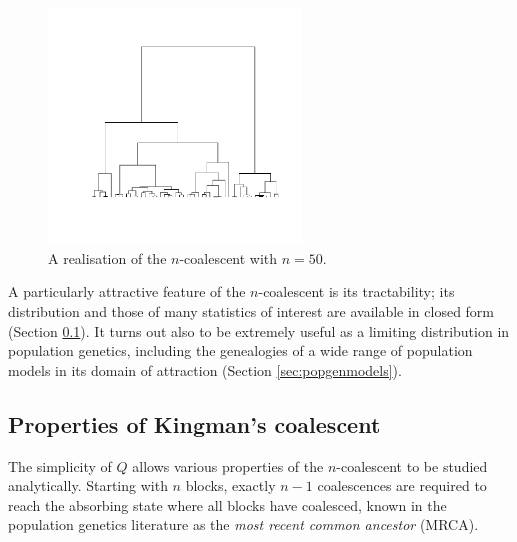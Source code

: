 \begin{figure}
\centering
\includegraphics[width=0.6\textwidth, trim={2.8cm 3cm 1.5cm 2cm}, clip]{plots/ncoalescent.pdf}
\caption[The $n$-coalescent]{A realisation of the $n$-coalescent with $n=50$.}
\end{figure}

A particularly attractive feature of the $n$-coalescent is its tractability; its distribution and those of many statistics of interest are available in closed form (Section \ref{sec:KCproperties}).
It turns out also to be extremely useful as a limiting distribution in population genetics, including the genealogies of a wide range of population models in its domain of attraction (Section \ref{sec:popgenmodels}).


\subsection{Properties of Kingman's coalescent \seb{$\checkmark$} }\label{sec:KCproperties}
The simplicity of $Q$ allows various properties of the $n$-coalescent to be studied analytically. 
Starting with $n$ blocks, exactly $n-1$ coalescences are required to reach the absorbing state where all blocks have coalesced, known in the population genetics literature as the \emph{most recent common ancestor} (MRCA).

